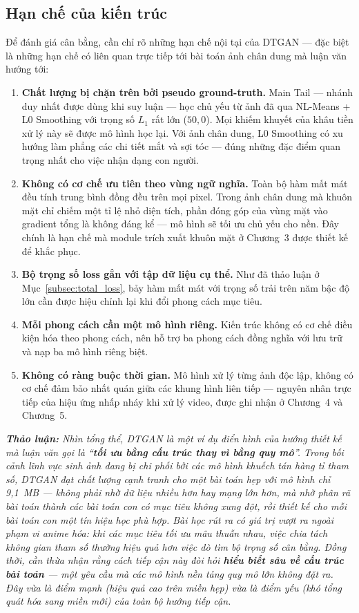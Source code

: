 \subsection{Hạn chế của kiến trúc}
\label{subsec:dtgan_limitations}

Để đánh giá cân bằng, cần chỉ rõ những hạn chế nội tại của DTGAN --- đặc biệt là những hạn chế có liên quan trực tiếp tới bài toán ảnh chân dung mà luận văn hướng tới:

\begin{enumerate}
    \item \textbf{Chất lượng bị chặn trên bởi pseudo ground-truth.} Main Tail --- nhánh duy nhất được dùng khi suy luận --- học chủ yếu từ ảnh đã qua NL-Means + L0 Smoothing với trọng số $L_1$ rất lớn ($50{,}0$). Mọi khiếm khuyết của khâu tiền xử lý này sẽ được mô hình học lại. Với ảnh chân dung, L0 Smoothing có xu hướng làm phẳng các chi tiết mắt và sợi tóc --- đúng những đặc điểm quan trọng nhất cho việc nhận dạng con người.
    \item \textbf{Không có cơ chế ưu tiên theo vùng ngữ nghĩa.} Toàn bộ hàm mất mát đều tính trung bình đồng đều trên mọi pixel. Trong ảnh chân dung mà khuôn mặt chỉ chiếm một tỉ lệ nhỏ diện tích, phần đóng góp của vùng mặt vào gradient tổng là không đáng kể --- mô hình sẽ tối ưu chủ yếu cho nền. Đây chính là hạn chế mà module trích xuất khuôn mặt ở Chương~3 được thiết kế để khắc phục.
    \item \textbf{Bộ trọng số loss gắn với tập dữ liệu cụ thể.} Như đã thảo luận ở Mục~\ref{subsec:total_loss}, bảy hàm mất mát với trọng số trải trên năm bậc độ lớn cần được hiệu chỉnh lại khi đổi phong cách mục tiêu.
    \item \textbf{Mỗi phong cách cần một mô hình riêng.} Kiến trúc không có cơ chế điều kiện hóa theo phong cách, nên hỗ trợ ba phong cách đồng nghĩa với lưu trữ và nạp ba mô hình riêng biệt.
    \item \textbf{Không có ràng buộc thời gian.} Mô hình xử lý từng ảnh độc lập, không có cơ chế đảm bảo nhất quán giữa các khung hình liên tiếp --- nguyên nhân trực tiếp của hiệu ứng nhấp nháy khi xử lý video, được ghi nhận ở Chương~4 và Chương~5.
\end{enumerate}

\medskip
\noindent\textit{\textbf{Thảo luận:} Nhìn tổng thể, DTGAN là một ví dụ điển hình của hướng thiết kế mà luận văn gọi là ``\textbf{tối ưu bằng cấu trúc thay vì bằng quy mô}''. Trong bối cảnh lĩnh vực sinh ảnh đang bị chi phối bởi các mô hình khuếch tán hàng tỉ tham số, DTGAN đạt chất lượng cạnh tranh cho một bài toán hẹp với mô hình chỉ 9,1~MB --- không phải nhờ dữ liệu nhiều hơn hay mạng lớn hơn, mà nhờ phân rã bài toán thành các bài toán con có mục tiêu không xung đột, rồi thiết kế cho mỗi bài toán con một tín hiệu học phù hợp. Bài học rút ra có giá trị vượt ra ngoài phạm vi anime hóa: khi các mục tiêu tối ưu mâu thuẫn nhau, việc chia tách không gian tham số thường hiệu quả hơn việc dò tìm bộ trọng số cân bằng. Đồng thời, cần thừa nhận rằng cách tiếp cận này đòi hỏi \textbf{hiểu biết sâu về cấu trúc bài toán} --- một yêu cầu mà các mô hình nền tảng quy mô lớn không đặt ra. Đây vừa là điểm mạnh (hiệu quả cao trên miền hẹp) vừa là điểm yếu (khó tổng quát hóa sang miền mới) của toàn bộ hướng tiếp cận.}

